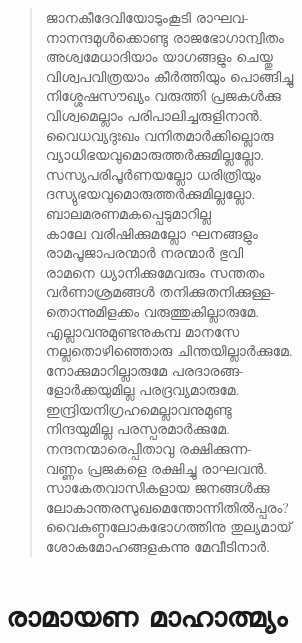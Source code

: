 \begin{verse}
ജാനകീദേവിയോടുംകൂടി രാഘവ-\\
നാനന്ദമുള്‍ക്കൊണ്ടു രാജഭോഗാന്വിതം\\
അശ്വമേധാദിയാം യാഗങ്ങളും ചെയ്തു\\
വിശ്വപവിത്രയാം കീര്‍ത്തിയും പൊങ്ങിച്ചു\\
നിശ്ശേഷസൗഖ്യം വരുത്തി പ്രജകള്‍ക്കു\\
വിശ്വമെല്ലാം പരിപാലിച്ചരുളിനാന്‍.\\
വൈധവ്യദുഃഖം വനിതമാര്‍ക്കില്ലൊരു\\
വ്യാധിഭയവുമൊരുത്തര്‍ക്കുമില്ലല്ലോ.\\
സസ്യപരിപൂര്‍ണയല്ലോ ധരിത്രിയും\\
ദസ്യുഭയവുമൊരുത്തര്‍ക്കുമില്ലല്ലോ.\\
ബാലമരണമകപ്പെടുമാറില്ല\\
കാലേ വരിഷിക്കുമല്ലോ ഘനങ്ങളും\\
രാമപൂജാപരന്മാര്‍ നരന്മാര്‍ ഭുവി\\
രാമനെ ധ്യാനിക്കുമേവരും സന്തതം\\
വര്‍ണാശ്രമങ്ങള്‍ തനിക്കുതനിക്കുള്ള-\\
തൊന്നുമിളക്കം വരുത്തുകില്ലാരുമേ.\\
എല്ലാവനുമുണ്ടനുകമ്പ മാനസേ\\
നല്ലതൊഴിഞ്ഞൊരു ചിന്തയില്ലാര്‍ക്കുമേ.\\
നോക്കുമാറില്ലാരുമേ പരദാരങ്ങ-\\
ളോര്‍ക്കയുമില്ല പരദ്രവ്യമാരുമേ.\\
ഇന്ദ്രിയനിഗ്രഹമെല്ലാവനുമുണ്ടു\\
നിന്ദയുമില്ല പരസ്പരമാര്‍ക്കുമേ.\\
നന്ദനന്മാരെപ്പിതാവു രക്ഷിക്കുന്ന-\\
വണ്ണം പ്രജകളെ രക്ഷിച്ചു രാഘവന്‍.\\
സാകേതവാസികളായ ജനങ്ങള്‍ക്കു\\
ലോകാന്തരസുഖമെന്തോന്നിതില്‍പ്പരം?\\
വൈകുണ്ഠലോകഭോഗത്തിനു തുല്യമായ്\\
ശോകമോഹങ്ങളകന്നു മേവീടിനാര്‍.
\end{verse}


\section{രാമായണ മാഹാത്മ്യം}

